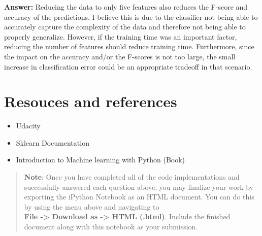 \documentclass[11pt]{article}
\providecommand{\tightlist}{%
      \setlength{\itemsep}{0pt}\setlength{\parskip}{0pt}}
\begin{document}
    \textbf{Answer:} Reducing the data to only five features also reduces
the F-score and accuracy of the predictions. I believe this is due to
the classifier not being able to accurately capture the complexity of
the data and therefore not being able to properly generalize. However,
if the training time was an important factor, reducing the number of
features should reduce training time. Furthermore, since the impact on
the accuracy and/or the F-scores is not too large, the small increase in
classification error could be an appropriate tradeoff in that scenario.

    \section{Resouces and references}\label{resouces-and-references}

    \begin{itemize}
\tightlist
\item
  Udacity
\item
  Sklearn Documentation
\item
  Introduction to Machine learning with Python (Book)
\end{itemize}

    \begin{quote}
\textbf{Note}: Once you have completed all of the code implementations
and successfully answered each question above, you may finalize your
work by exporting the iPython Notebook as an HTML document. You can do
this by using the menu above and navigating to\\
\textbf{File -\textgreater{} Download as -\textgreater{} HTML (.html)}.
Include the finished document along with this notebook as your
submission.
\end{quote}


    
    
    
    
\end{document}

